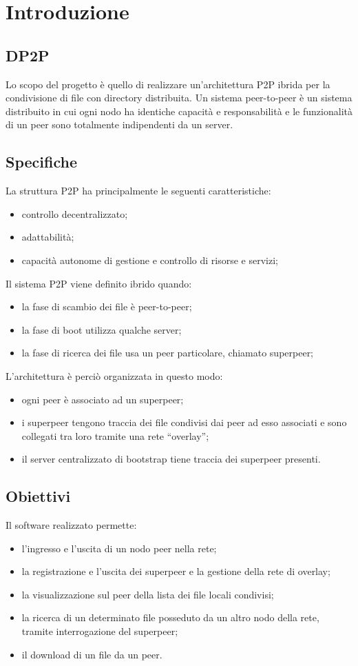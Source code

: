 \section{Introduzione}
\subsection{DP2P}
Lo scopo del progetto è quello di realizzare un'architettura P2P ibrida per la condivisione di file con directory distribuita.
Un sistema peer-to-peer è un sistema distribuito in cui ogni nodo ha identiche capacità e responsabilità e le funzionalità di un peer sono totalmente indipendenti da un server.
\subsection{Specifiche}
La struttura P2P ha principalmente le seguenti caratteristiche:
\begin{itemize}
\item controllo decentralizzato;
\item adattabilità;
\item capacità autonome di gestione e controllo di risorse e servizi;
\end{itemize}
Il sistema P2P viene definito ibrido quando:
\begin{itemize}
\item la fase di scambio dei file è peer-to-peer;
\item la fase di boot utilizza qualche server;
\item la fase di ricerca dei file usa un peer particolare, chiamato superpeer;
\end{itemize}
L'architettura è perciò organizzata in questo modo:
\begin{itemize}
\item ogni peer è associato ad un superpeer;
\item i superpeer tengono traccia dei file condivisi dai peer ad esso associati e sono collegati tra loro tramite una rete  “overlay”; 
\item il server centralizzato di bootstrap tiene traccia dei superpeer presenti.
\end{itemize}
\subsection{Obiettivi}
Il software realizzato permette:
\begin{itemize}
\item l'ingresso e l'uscita di un nodo peer nella rete;
\item la registrazione e l'uscita dei superpeer e la gestione della rete di overlay;
\item la visualizzazione sul peer della lista dei file locali condivisi;
\item la ricerca di un determinato file posseduto da un altro nodo della rete, tramite interrogazione del superpeer;
\item il download di un file da un peer.
\end{itemize}
